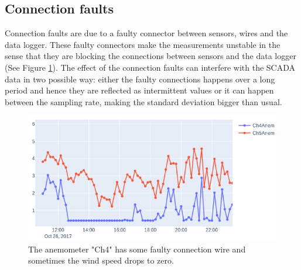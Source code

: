 \documentclass[conference]{IEEEtran}
\begin{document}
\subsection{Connection faults}
Connection faults are due to a faulty connector between sensors, wires and the data logger. These faulty connectors make the measurements unstable in the sense that they are blocking the connections between sensors and the data logger (See Figure \ref{fig:connectionFaults}). The effect of the connection faults can interfere with the SCADA data in two possible way: either the faulty connections happens over a long period and hence they are reflected as intermittent values or it can happen between the sampling rate, making the standard deviation bigger than usual. \begin{figure}[h]
	\centering
	\includegraphics[width=\columnwidth]{Images/ConnectionFaults.png}
	\caption{The anemometer "Ch4" has some faulty connection wire and sometimes the wind speed drops to zero.}
	\label{fig:connectionFaults}
\end{figure}
\end{document}
